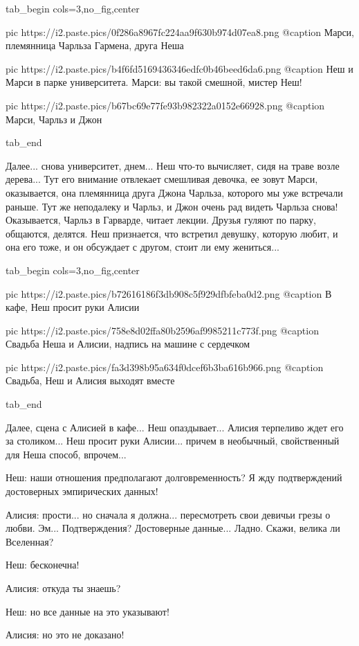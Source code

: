 \ifcmt
  tab_begin cols=3,no_fig,center

     pic https://i2.paste.pics/0f286a8967fc224aa9f630b974d07ea8.png
		 @caption Марси, племянница Чарльза Гармена, друга Неша

		 pic https://i2.paste.pics/b4f6fd5169436346edfc0b46beed6da6.png
		 @caption Неш и Марси в парке университета. Марси: вы такой смешной, мистер Неш!

		 pic https://i2.paste.pics/b67bc69e77fe93b982322a0152e66928.png
		 @caption Марси, Чарльз и Джон

  tab_end
\fi

Далее... снова университет, днем... Неш что-то вычисляет, сидя на траве возле
дерева...  Тут его внимание отвлекает смешливая девочка, ее зовут Марси,
оказывается, она племянница друга Джона Чарльза, которого мы уже встречали
раньше. Тут же неподалеку и Чарльз, и Джон очень рад видеть Чарльза снова!
Оказывается, Чарльз в Гарварде, читает лекции. Друзья гуляют по парку,
общаются, делятся.  Неш признается, что встретил девушку, которую любит, и она
его тоже, и он обсуждает с другом, стоит ли ему жениться...

\ifcmt
  tab_begin cols=3,no_fig,center

     pic https://i2.paste.pics/b72616186f3db908c5f929dfbfeba0d2.png
		 @caption В кафе, Неш просит руки Алисии

		 pic https://i2.paste.pics/758e8d02ffa80b2596af9985211c773f.png
		 @caption Свадьба Неша и Алисии, надпись на машине с сердечком

		 pic https://i2.paste.pics/fa3d398b95a634f0dcef6b3ba616b966.png
		 @caption Свадьба, Неш и Алисия выходят вместе

  tab_end
\fi

Далее, сцена с Алисией в кафе... Неш опаздывает... Алисия терпеливо ждет его за
столиком... Неш просит руки Алисии... причем в необычный, свойственный для Неша способ, впрочем...

Неш: наши отношения предполагают долговременность? Я жду подтверждений достоверных эмпирических данных!

Алисия: прости... но сначала я должна... пересмотреть свои девичьи грезы о
любви. Эм... Подтверждения?  Достоверные данные... Ладно. Скажи, велика ли
Вселенная?

Неш: бесконечна!

Алисия: откуда ты знаешь?

Неш: но все данные на это указывают!

Алисия: но это не доказано!

